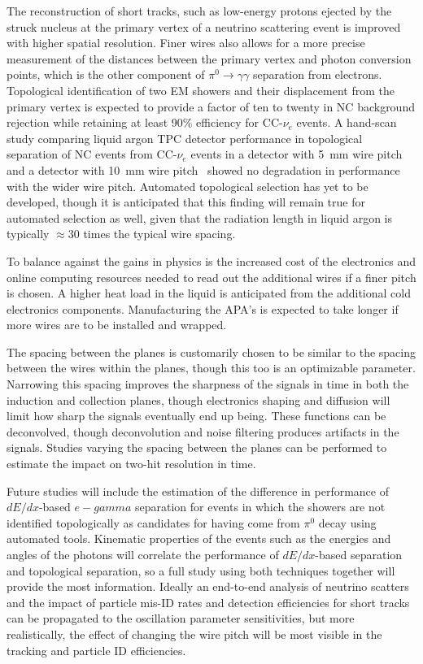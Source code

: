 The reconstruction of short tracks, such as low-energy
protons ejected by the struck nucleus at the primary vertex of a neutrino scattering event
is improved with higher spatial resolution.  Finer wires also allows for a more precise measurement
of the distances between the primary vertex and photon conversion points, which is the other
component of $\pi^0\rightarrow\gamma\gamma$ separation from electrons.  Topological
identification of two EM showers and their displacement from the primary vertex is expected
to provide a factor of ten to twenty in NC background rejection while retaining at least 90\%
efficiency for CC-$\nu_e$ events.  A hand-scan study comparing liquid argon TPC detector performance
in topological separation of NC events from CC-$\nu_e$ events in a detector with 5~mm wire pitch
and a detector with 10~mm wire pitch~\cite{2008-hand-scan} showed no degradation in performance with
the wider wire pitch.  Automated topological selection has yet to be developed, though it is
anticipated that this finding will remain true for automated selection as well, given that the
radiation length in liquid argon is typically $\approx 30$ times the typical wire spacing.

To balance against the gains in physics is the increased cost of the electronics and
online computing resources needed to read out the additional wires if a finer pitch is chosen.
A higher heat load in the liquid is anticipated from the additional cold electronics components.
Manufacturing the APA's is expected to take longer if more wires are to be installed and wrapped.

The spacing between the planes is customarily chosen to be similar to the spacing between
the wires within the planes, though this too is an optimizable parameter.  Narrowing this
spacing improves the sharpness of the signals in time in both the induction and collection planes,
though electronics shaping and diffusion will limit how sharp the signals eventually end up being.
These functions can be deconvolved, though deconvolution and noise filtering produces 
artifacts in the signals.  Studies varying the spacing between the planes can be performed
to estimate the impact on two-hit resolution in time.

Future studies will include the estimation of the difference in performance of $dE/dx$-based
$e-gamma$ separation for events in which the showers are not identified topologically as
candidates for having come from $\pi^0$ decay using automated tools.  Kinematic properties
of the events such as the energies and angles of the photons will correlate the performance
of $dE/dx$-based separation and topological separation, so a full study using both techniques
together will provide the most information.  Ideally an end-to-end analysis of neutrino
scatters and the impact of particle mis-ID rates and detection efficiencies for short tracks
can be propagated to the oscillation parameter sensitivities, but more realistically, the
effect of changing the wire pitch will be most visible in the 
tracking and particle ID efficiencies.


